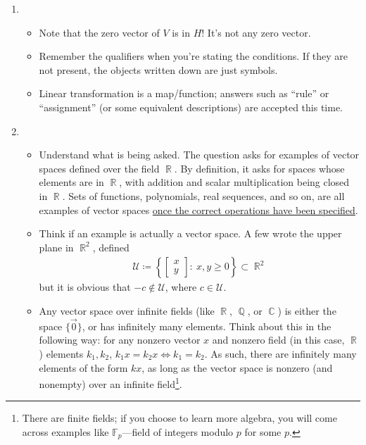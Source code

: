 \documentclass[answers,11pt]{exam}
\theoremstyle{definition}
\DeclareMathOperator{\Q}{\mathbb{Q}}
\DeclareMathOperator{\R}{\mathbb{R}}
\DeclareMathOperator{\Com}{\mathbb{C}}
\DeclareMathOperator{\1}{\mathbbm{1}}
\renewcommand{\geq}{\geqslant}
\newcommand{\condset}[4]{\left\{ #1  : \: #2 #3 #4 \right\}}
\begin{document}
\begin{enumerate}
	\item \begin{itemize}
		\item Note that the zero vector of $V$ is in $H$! It's not any zero vector.
		\item Remember the qualifiers when you're stating the conditions. If they are not present, the objects written down are just symbols.
		\item Linear transformation is a map/function; answers such as ``rule'' or ``assignment'' (or some equivalent descriptions) are accepted this time.
	\end{itemize}
	
	
	\item \begin{itemize}
		\item Understand what is being asked. The question asks for examples of vector spaces defined over the field $\R$. By definition, it asks for spaces whose elements are in $\R$, with addition and scalar multiplication being closed in $\R$. Sets of functions, polynomials, real sequences, and so on, are all examples of vector spaces \uline{once the correct operations have been specified}.
		
		\item Think if an example is actually a vector space. A few wrote the upper plane in $\R^2$, defined
		\begin{align*}
		\mathcal{U} \coloneqq \condset{ \begin{bmatrix}
			x \\ y
			\end{bmatrix}}{x,y}{\geq}{0} \subset \R^2
		\end{align*}
		but it is obvious that $-c \notin \mathcal{U}$, where $c \in \mathcal{U}$.
		
		\item Any vector space over infinite fields (like $\R$, $\Q$, or $\Com$) is either the space $\{\vec{0}\}$, or has infinitely many elements. Think about this in the following way: for any nonzero vector $x$ and nonzero field (in this case, $\R$) elements $k_1,k_2$, $k_1 x = k_2 x \iff k_1 = k_2$. As such, there are infinitely many elements of the form $kx$, as long as the vector space is nonzero (and nonempty) over an infinite field\footnote{There are finite fields; if you choose to learn more algebra, you will come across examples like $\mathbb{F}_p$---field of integers modulo $p$ for some $p$.}.
		

\end{itemize}
\end{enumerate}
\end{document}

